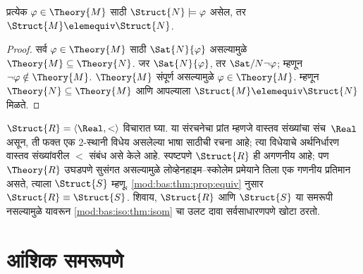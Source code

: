 \begin{prop}\label{mod:bas:thm:prop:equiv}
  प्रत्येक $\varphi \in \Theory{M}$ साठी $\Struct{N} \models \varphi$ असेल,
  तर $\Struct{M} \elemequiv \Struct{N}$.
\end{prop}

\begin{proof}
सर्व $\varphi \in \Theory{M}$ साठी $\Sat{N}{\varphi}$ असल्यामुळे
$\Theory{M} \subseteq \Theory{N}$. जर $\Sat{N}{\varphi}$, तर
$\Sat/{N}{\lnot \varphi}$; म्हणून $\lnot \varphi \notin \Theory{M}$.
$\Theory{M}$ संपूर्ण असल्यामुळे $\varphi \in \Theory{M}$. म्हणून
$\Theory{N} \subseteq \Theory{M}$ आणि आपल्याला
$\Struct{M} \elemequiv \Struct{N}$ मिळते.
\end{proof}

\begin{rem}\label{mod:bas:thm:remark:R}
  $\Struct{R} = \langle\Real, <\rangle$ विचारात घ्या. या
  संरचनेचा प्रांत म्हणजे वास्तव संख्यांचा संच~$\Real$ असून,
  ती फक्त एक 2-स्थानी विधेय असलेल्या भाषा साठीची रचना
  आहे; त्या विधेयाचे अर्थनिर्धारण वास्तव संख्यांवरील $<$ संबंध असे केले
  आहे. स्पष्टपणे $\Struct{R}$ ही अगणनीय आहे; पण
  $\Theory{R}$ उघडपणे सुसंगत असल्यामुळे लोव्हेनहाइम--स्कोलेम प्रमेयाने
  तिला एक गणनीय प्रतिमान असते, त्याला $\Struct{S}$ म्हणू.
  \ref{mod:bas:thm:prop:equiv} नुसार $\Struct{R} \equiv \Struct{S}$. शिवाय,
  $\Struct{R}$ आणि $\Struct{S}$ या समरूपी नसल्यामुळे यावरून
  \ref{mod:bas:iso:thm:isom} चा उलट दावा सर्वसाधारणपणे खोटा ठरतो.
\end{rem}











\section{आंशिक समरूपणे}\label{mod:bas:pis:sec}

